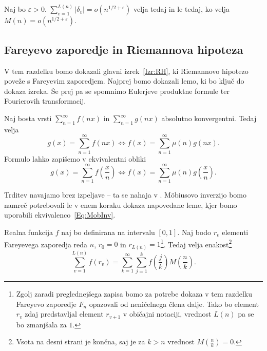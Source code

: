 \documentclass[mat1]{fmfdelo}
\begin{document}
\begin{izrek}
\label{Izr:RH}
Naj bo $\varepsilon > 0$. \( \sum_{v=1}^{L(n)}|\delta_{v}| = o(n^{1/2+\varepsilon}) \) velja tedaj in le tedaj, ko velja \( M(n) = o(n^{1/2+\varepsilon}). \)
\end{izrek}

\subsection{Fareyevo zaporedje in Riemannova hipoteza}

V tem razdelku bomo dokazali glavni izrek~\ref{Izr:RH}, ki Riemannovo hipotezo poveže s Fareyevim zaporedjem. Najprej bomo dokazali lemo, ki bo ključ do dokaza izreka. Še prej pa se spomnimo Eulerjeve produktne formule ter Fourierovih transformacij.

\begin{trditev}
Naj bosta vrsti $\sum_{n=1}^{\infty} f(nx)$ in $\sum_{n=1}^{\infty} g(nx)$ absolutno konvergentni. Tedaj velja
\begin{equation}
g(x) = \sum_{n=1}^{\infty} f(nx) \Longleftrightarrow f(x) = \sum_{n=1}^{\infty} \mu(n) g(nx).
\end{equation}
Formulo lahko zapišemo v ekvivalentni obliki
\begin{equation}
\label{Eq:MobInv}
g(x) = \sum_{n=1}^{\infty} f \left(\frac{x}{n} \right) \Longleftrightarrow f(x) = \sum_{n=1}^{\infty} \mu(n) g \left(\frac{x}{n} \right).
\end{equation}
%
\end{trditev}

Trditev navajamo brez izpeljave -- ta se nahaja v \cite[poglavje 10.9]{zetafunction}. M\"obiusovo inverzijo bomo namreč potrebovali le v enem koraku dokaza napovedane leme, kjer bomo uporabili ekvivalenco~\eqref{Eq:MobInv}.

\begin{lema}
\label{Lema:RiemFar}
Realna funkcija $f$ naj bo definirana na intervalu $[0,1]$. Naj bodo $r_{v}$ elementi Fareyevega zaporedja reda $n$, $r_{0}=0$ in $r_{L(n)}=1$\footnote{Zgolj zaradi preglednejšega zapisa bomo za potrebe dokaza v tem razdelku Fareyevo zaporedje $F_{n}$ opazovali od neničelnega člena dalje. Tako bo element $r_{v}$ zdaj predstavljal element $r_{v+1}$ v običajni notaciji, vrednost $L(n)$ pa se bo zmanjšala za $1$.}. Tedaj velja enakost\footnote{Vsota na desni strani je končna, saj je za $k>n$ vrednost $M(\frac{n}{k})=0$.}
\begin{equation}
\label{Eq:RiemFar1}
	\sum_{v=1}^{L(n)} f(r_v) = \sum_{k=1}^{\infty} \sum_{j=1}^{k} f \left(\frac{j}{k} \right) M \left(\frac{n}{k} \right).
\end{equation}
\end{lema}
\end{document}
